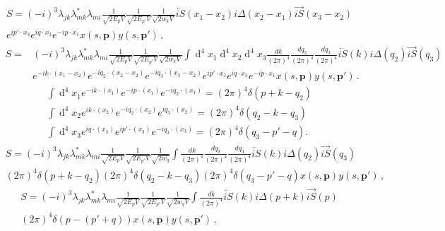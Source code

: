\begin{align}
S=(-i)^3\lambda_{jk}\lambda^*_{mk}\lambda_{mi}\frac{1}{\sqrt{2E_p V}}\frac{1}{\sqrt{2E_{p'} V}}\frac{1}{\sqrt{2w_k V}}\overleftarrow{iS}(x_{1}-x_{2})i\Delta(x_{2}-x_{1})\overrightarrow{iS}(x_{3}-x_{2})\nonumber \\ e^{i p'\cdot x_{3}}e^{i q\cdot x_{3}}e^{-i p\cdot x_{1}}x(s,\boldsymbol{p})y(s,\boldsymbol{p'})\, ,
\end{align}
\begin{align}
S=&(-i)^{3}\lambda_{jk}\lambda^*_{mk}\lambda_{mi}\frac{1}{\sqrt{2E_p V}}\frac{1}{\sqrt{2E_{p'} V}}\frac{1}{\sqrt{2w_k V}}\int\operatorname{d}^{4}x_{1}\operatorname{d}^{4}x_{2}
\operatorname{d}^{4}x_{3} \frac{dk}{(2\pi)^4}\frac{dq_{2}}{(2\pi)^4}\frac{dq_{3}}{(2\pi)^4}\overleftarrow{iS}(k)i\Delta(q_{2})\overrightarrow{iS}(q_{3})\nonumber\\ 
&e^{-ik\cdot (x_{1}-x_{2})}e^{-iq_{2}\cdot (x_{2}-x_{2})}e^{-iq_{3}\cdot  (x_{3}-x_{2})}e^{ip'\cdot x_{3}}e^{i q\cdot x_{3}}e^{-i p\cdot x_{1}}x(s,\boldsymbol{p})y(s,\boldsymbol{p'})\, .
\end{align}
\begin{align}
\int\operatorname{d}^{4}x_{1}e^{-ik\cdot (x_{1})}e^{-ip\cdot (x_{1})}e^{-iq_{2}\cdot (x_{1})}=(2\pi)^4\delta(p+k-q_{2})\\ 
\int\operatorname{d}^{4}x_{2}e^{ik\cdot (x_{2})}e^{-iq_{2}\cdot (x_{2})}e^{iq_{3}\cdot (x_{2})}=(2\pi)^4\delta(q_{2}-k-q_{3})\\
\int\operatorname{d}^{4}x_{3}e^{iq\cdot (x_{3})}e^{ip'\cdot (x_{3})}e^{-iq_{3}\cdot (x_{3})}=(2\pi)^4\delta(q_{3}-p'-q).
\end{align}
\begin{align}
S={(-i)^3}\lambda_{jk}\lambda^*_{mk}\lambda_{mi}\frac{1}{\sqrt{2E_p V}}\frac{1}{\sqrt{2E_{p'} V}}\frac{1}{\sqrt{2w_q}}\int \frac{dk}{(2\pi)^4}\frac{dq_{2}}{(2\pi)^4}\frac{dq_{3}}{(2\pi)^4}\overleftarrow{iS}(k)i\Delta(q_{2})\overrightarrow{iS}(q_{3})\nonumber\\(2\pi)^4\delta(p+k-q_{2})(2\pi)^4\delta(q_{2}-k-q_{3})(2\pi)^4\delta(q_{3}-p'-q)x(s,\boldsymbol{p})y(s,\boldsymbol{p'})\, ,
\end{align}
  \begin{align}
S={(-i)^3}\lambda_{jk}\lambda^*_{mk}\lambda_{mi}\frac{1}{\sqrt{2E_p V}}\frac{1}{\sqrt{2E_{p'} V}}\frac{1}{\sqrt{2w_q V}}\int \frac{dk}{(2\pi)^4}\overleftarrow{iS}(k)i\Delta(p+k)\overrightarrow{iS}(p)\nonumber\\(2\pi)^4\delta(p-(p'+q))
x(s,\boldsymbol{p})y(s,\boldsymbol{p'})\, ,
\end{align}
